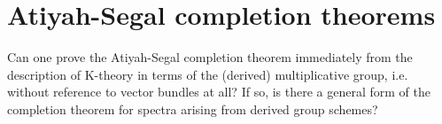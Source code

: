 
\section{Atiyah-Segal completion theorems}

\begin{ideas}
\item Can one prove the Atiyah-Segal completion theorem immediately
  from the description of K-theory in terms of the (derived)
  multiplicative group, i.e. without reference to vector bundles at
  all? If so, is there a general form of the completion theorem
  for spectra arising from derived group schemes?
\end{ideas}



